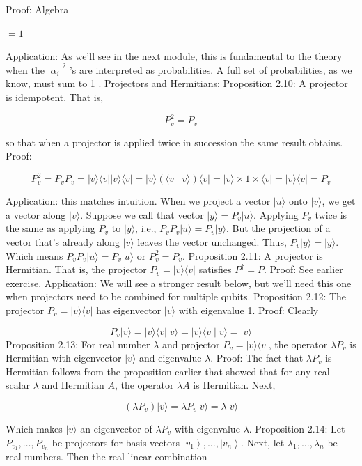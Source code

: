 \documentclass[main.tex]{subfiles}
\begin{document}
    Proof: Algebra
    
    $=1$
    
    Application: As we'll see in the next module, this is fundamental to the theory when the $\left|\alpha_{i}\right|^{2}$ 's are interpreted as probabilities. A full set of probabilities, as we know, must sum to 1 . Projectors and Hermitians: Proposition 2.10: A projector is idempotent. That is,
    
    $$
    P_{v}^{2}=P_{v}
    $$
    
    so that when a projector is applied twice in succession the same result obtains. Proof:
    
    $$
    P_{v}^{2}=P_{v} P_{v}=|v\rangle\langle v|| v\rangle\langle v|=| v\rangle(\langle v \mid v\rangle)\langle v|=| v\rangle \times 1 \times\langle v|=| v\rangle\langle v|=P_{v}
    $$
    
    Application: this matches intuition. When we project a vector $|u\rangle$ onto $|v\rangle$, we get a vector along $|v\rangle$. Suppose we call that vector $|y\rangle=P_{v}|u\rangle$. Applying $P_{v}$ twice is the same as applying $P_{v}$ to $|y\rangle$, i.e., $P_{v} P_{v}|u\rangle=P_{v}|y\rangle$. But the projection of a vector that's already along $|v\rangle$ leaves the vector unchanged. Thus, $P_{v}|y\rangle=|y\rangle$. Which means $P_{v} P_{v}|u\rangle=P_{v}|u\rangle$ or $P_{v}^{2}=P_{v}$. Proposition 2.11: A projector is Hermitian. That is, the projector $P_{v}=|v\rangle\langle v|$ satisfies $P^{\dagger}=P$. Proof: See earlier exercise. Application: We will see a stronger result below, but we'll need this one when projectors need to be combined for multiple qubits. Proposition 2.12: The projector $P_{v}=|v\rangle\langle v|$ has eigenvector $|v\rangle$ with eigenvalue 1. Proof: Clearly 
    
    $$ 
    P_{v}|v\rangle=|v\rangle\langle v|| v\rangle=|v\rangle\langle v \mid v\rangle=|v\rangle
    $$
    Proposition 2.13: For real number $\lambda$ and projector $P_{v}=|v\rangle\langle v|$, the operator $\lambda P_{v}$ is Hermitian with eigenvector $|v\rangle$ and eigenvalue $\lambda$. Proof: The fact that $\lambda P_{v}$ is Hermitian follows from the proposition earlier that showed that for any real scalar $\lambda$ and Hermitian $A$, the operator $\lambda A$ is Hermitian. Next,
    
    $$
    \left(\lambda P_{v}\right)|v\rangle=\lambda P_{v}|v\rangle=\lambda|v\rangle
    $$
    
    Which makes $|v\rangle$ an eigenvector of $\lambda P_{v}$ with eigenvalue $\lambda$. Proposition 2.14: Let $P_{v_{1}}, \ldots, P_{v_{n}}$ be projectors for basis vectors $\left|v_{1}\right\rangle, \ldots,\left|v_{n}\right\rangle$. Next, let $\lambda_{1}, \ldots, \lambda_{n}$ be real numbers. Then the real linear combination
    
\end{document}
